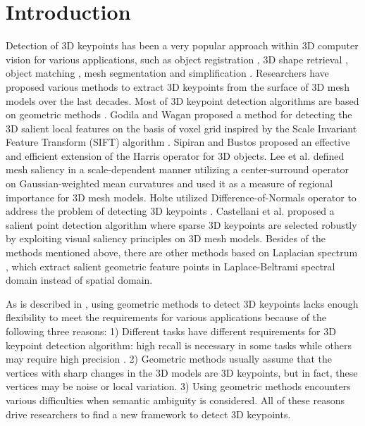 \documentclass[runningheads]{article}
\begin{document}
\section{Introduction}
Detection of 3D keypoints has been a very popular approach within 3D computer vision for various applications, such as object registration \cite{Registration2005robust}, 3D shape retrieval \cite{Retrieval2004shape}, object matching \cite{hu2009salient}, mesh segmentation \cite{segmentation2005mesh} and simplification \cite{Meshsaliency2005mesh}. Researchers have proposed various methods to extract 3D keypoints from the surface of 3D mesh models over the last decades. Most of 3D keypoint detection algorithms are based on geometric methods \cite{Meshsaliency2005mesh,3Dsift2011salient,3Dharris2011harris,sun2009concise,novatnack2007scale,don20143d,castellani2008sparse,wang2013sdtp,akagunduz2009scale,meshdog2009,LSP20073d,ISS2009,KPS2010repeatability,LBSS2008,scakemeshdog}. Godila and Wagan \cite{3Dsift2011salient} proposed a method for detecting the 3D salient local features on the  basis of voxel grid inspired by the Scale Invariant Feature Transform (SIFT) algorithm \cite{sift2004distinctive}. Sipiran and Bustos \cite{3Dharris2011harris} proposed an effective and efficient extension of the Harris operator \cite{harris1988combined} for 3D objects. Lee et al. \cite{Meshsaliency2005mesh} defined mesh saliency in a scale-dependent manner utilizing a center-surround operator on Gaussian-weighted mean curvatures and used it as a measure of regional importance for 3D mesh models. Holte utilized Difference-of-Normals operator to address the problem of detecting 3D keypoints \cite{don20143d}. Castellani et al. \cite{castellani2008sparse} proposed a salient point detection algorithm where sparse 3D keypoints are selected robustly by exploiting visual saliency principles on 3D mesh models. Besides of the methods mentioned above, there are other methods based on Laplacian spectrum \cite{hu2009salient,song20133d,song2014mesh}, which extract salient geometric feature points in Laplace-Beltrami spectral domain instead of spatial domain.

As is described in \cite{randomforest20143d}, using geometric methods to detect 3D keypoints lacks enough flexibility to meet the requirements for various applications because of the following three reasons: 1) Different tasks have different requirements for 3D keypoint detection algorithm: high recall is necessary in some tasks while others may require high precision \cite{mikolajczyk2005performance}. 2) Geometric methods usually assume that the vertices with sharp changes in the 3D models are 3D keypoints, but in fact, these vertices may be noise or local variation. 3) Using geometric methods encounters various difficulties when semantic ambiguity is considered. All of these reasons drive researchers to find a new framework to detect 3D keypoints.
\end{document}
